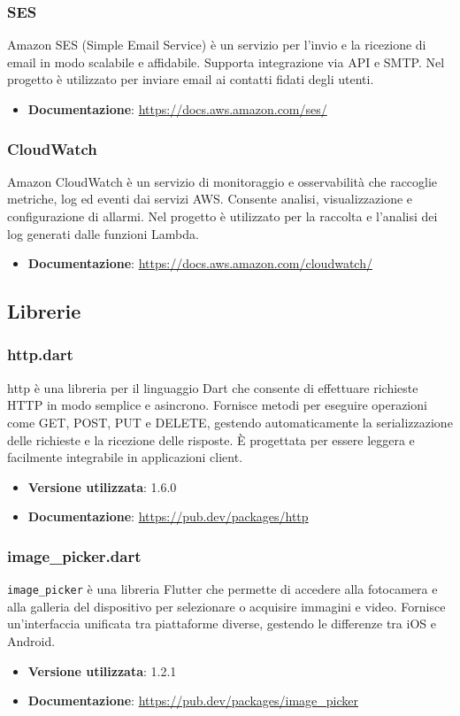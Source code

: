 \documentclass[a4paper,12pt]{article}
\begin{document}
\subsubsection{SES}
Amazon SES (Simple Email Service) è un servizio per l’invio e la ricezione di email in modo scalabile e affidabile. Supporta integrazione via API e SMTP. Nel progetto è utilizzato per inviare email ai contatti fidati degli utenti.
\begin{itemize}
    \item \textbf{Documentazione}: \url{https://docs.aws.amazon.com/ses/}
\end{itemize}

\subsubsection{CloudWatch}
Amazon CloudWatch è un servizio di monitoraggio e osservabilità che raccoglie metriche, log ed eventi dai servizi AWS. Consente analisi, visualizzazione e configurazione di allarmi. Nel progetto è utilizzato per la raccolta e l’analisi dei log generati dalle funzioni Lambda.
\begin{itemize}
    \item \textbf{Documentazione}: \url{https://docs.aws.amazon.com/cloudwatch/}
\end{itemize}

\subsection{Librerie} \label{subsec:librerie}

\subsubsection{http.dart}
http è una libreria per il linguaggio Dart che consente di effettuare richieste HTTP in modo semplice e asincrono. Fornisce metodi per eseguire operazioni come GET, POST, PUT e DELETE, gestendo automaticamente la serializzazione delle richieste e la ricezione delle risposte. È progettata per essere leggera e facilmente integrabile in applicazioni client.
\begin{itemize}
    \item \textbf{Versione utilizzata}: 1.6.0
    \item \textbf{Documentazione}: \url{https://pub.dev/packages/http}
\end{itemize}

\subsubsection{image\_picker.dart}
\texttt{image\_picker} è una libreria Flutter che permette di accedere alla fotocamera e alla galleria del dispositivo per selezionare o acquisire immagini e video. Fornisce un’interfaccia unificata tra piattaforme diverse, gestendo le differenze tra iOS e Android.
\begin{itemize}
    \item \textbf{Versione utilizzata}: 1.2.1
    \item \textbf{Documentazione}: \url{https://pub.dev/packages/image_picker}
\end{itemize}
\end{document}

